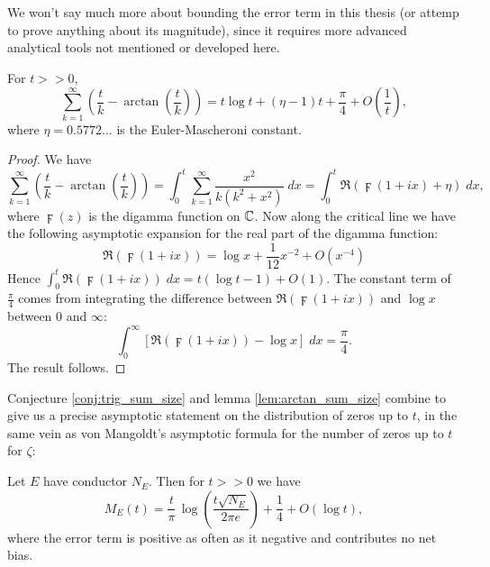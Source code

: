 We won't say much more about bounding the error term in this thesis (or attemp to prove anything about its magnitude), since it requires more advanced analytical tools not mentioned or developed here. \\

\begin{lemma}\label{lem:arctan_sum_size}
For $t >> 0$, 
\begin{equation}
\sum_{k=1}^{\infty} \left(\frac{t}{k} - \arctan\left(\frac{t}{k}\right)\right) = t\log t + (\eta-1)t + \frac{\pi}{4} + O\left(\frac{1}{t}\right),
\end{equation}
where $\eta = 0.5772\ldots$ is the Euler-Mascheroni constant.
\end{lemma}
\begin{proof}
We have
\begin{equation*}
\sum_{k=1}^{\infty} \left(\frac{t}{k} - \arctan\left(\frac{t}{k}\right)\right) = \int_{0}^{t} \sum_{k=1}^{\infty} \frac{x^2}{k(k^2+x^2)} \; dx = \int_{0}^{t} \Re\left(\digamma(1+ix) + \eta\right) \; dx,
\end{equation*}
where $\digamma(z)$ is the digamma function on $\mathbb{C}$. Now along the critical line we have the following asymptotic expansion for the real part of the digamma function:
\begin{equation}
\Re\left(\digamma(1+ix)\right) = \log x + \frac{1}{12} x^{-2} + O(x^{-4})
\end{equation}
Hence $\int_{0}^{t} \Re\left(\digamma(1+ix)\right) \; dx = t(\log t - 1)  + O(1)$. The constant term of $\frac{\pi}{4}$ comes from integrating the difference between $\Re\left(\digamma(1+ix)\right)$ and $\log x$ between $0$ and $\infty$:
\begin{equation*}
\int_{0}^{\infty} \left[\Re\left(\digamma(1+ix)\right) - \log x\right] \; dx = \frac{\pi}{4}.
\end{equation*}
The result follows.
\end{proof}

Conjecture \ref{conj:trig_sum_size} and lemma \ref{lem:arctan_sum_size} combine to give us a precise asymptotic statement on the distribution of zeros up to $t$, in the same vein as von Mangoldt's asymptotic formula for the number of zeros up to $t$ for $\zeta$:

\begin{theorem}[GRH]\label{thm:zero_density}
Let $E$ have conductor $N_E$. Then for $t>>0$ we have
\begin{equation}\label{eqn:zero_density}
M_E(t) = \frac{t}{\pi} \, \log\left(\frac{t\sqrt{N_E}}{2\pi e}\right) + \frac{1}{4} + O(\log t),
\end{equation}
where the error term is positive as often as it negative and contributes no net bias.
\end{theorem}

